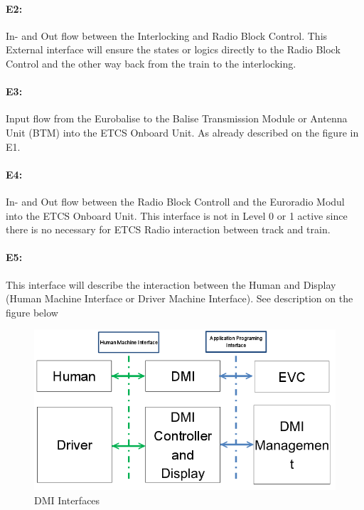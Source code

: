 \paragraph{E2:} In- and Out flow between the Interlocking and Radio Block Control.
This External interface will ensure the states or logics directly to the Radio Block Control and the other way back from the train to the interlocking.\\

\paragraph{E3:} Input flow from the Eurobalise to the Balise Transmission Module or Antenna Unit (BTM) into the ETCS Onboard Unit. As already described on the figure in E1.

\paragraph{E4:} In- and Out flow between the Radio Block Controll and the Euroradio Modul into the ETCS Onboard Unit. This interface is not in Level 0 or 1 active since there is no necessary for ETCS Radio interaction between track and train.

\paragraph{E5:} This interface will describe the interaction between the Human and Display (Human Machine Interface or Driver Machine Interface). 
See description on the figure below

\begin{figure}[h]
\centering
\includegraphics[scale=0.8]{images/DMIinterfaces}
\caption{DMI Interfaces}
\label{DMI Interfaces}
\end{figure}

